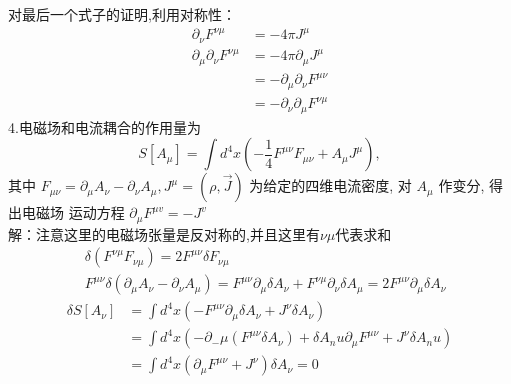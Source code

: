 \documentclass[UTF8]{ctexart}
\begin{document}
对最后一个式子的证明,利用对称性：
\begin{align*}
     \partial_{\nu}F^{\nu\mu}                & =-4\pi J^{\mu}                           \\
     \partial_{\mu}\partial_{\nu}F^{\nu \mu} & =-4\pi \partial_{\mu}J^{\mu}             \\
                                             & =-\partial_{\mu}\partial_{\nu}F^{\mu\nu} \\
                                             & =-\partial_{\nu}\partial_{\mu}F^{\nu\mu}
\end{align*}
4.电磁场和电流耦合的作用量为
$$
     S\left[A_{\mu}\right]=\int d^{4} x\left(-\frac{1}{4} F^{\mu \nu} F_{\mu \nu}+A_{\mu} J^{\mu}\right),
$$
其中 $F_{\mu \nu}=\partial_{\mu} A_{\nu}-\partial_{\nu} A_{\mu}, J^{\mu}=(\rho, \vec{J})$ 为给定的四维电流密度,
对 $A_{\mu}$ 作变分, 得出电磁场 运动方程 $\partial_{\mu} F^{\mu v}=-J^{v}$\\
解：注意这里的电磁场张量是反对称的,并且这里有$\nu \mu$代表求和
\begin{align*}
      & \delta(F^{\nu \mu }F_{\nu\mu})=2F^{\mu\nu}\delta F_{\nu\mu}                             \\
      & F^{\mu\nu}\delta(\partial_\mu A_\nu-\partial_\nu A_{\mu})=F^{\mu\nu}\partial_\mu \delta
     A_{\nu}+F^{\nu\mu}\partial_\nu\delta A_{\mu}=2F^{\mu\nu}\partial_\mu \delta A_{\nu}
\end{align*}
\begin{align*}
     \delta S[A_\nu] & =\int d^4x(-F^{\mu\nu}\partial_\mu\delta A_\nu+J^\nu \delta A_\nu)                                         \\
                     & =\int d^4x (-\partial_-\mu(F^{\mu\nu}\delta A_{\nu})+\delta A_nu\partial_\mu F^{\mu\nu}+J^\nu \delta A_nu) \\
                     & =\int d^4x (\partial_\mu F^{\mu\nu}+J^{\nu})\delta A_\nu=0
\end{align*}
\end{document}
